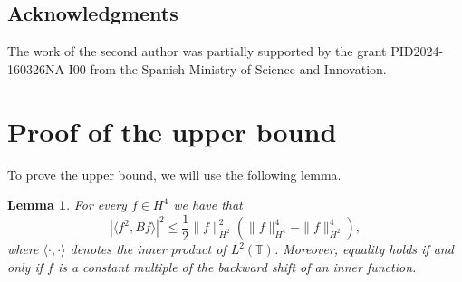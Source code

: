 \documentclass{amsart}
\theoremstyle{plain}
\newtheorem{lemma}[theo]{Lemma}
\theoremstyle{definition}
\newcommand{\T}{\mathbb{T}}
\begin{document}
    	\subsection*{Acknowledgments}
    	
    	The work of the second author was partially supported by the grant PID2024-160326NA-I00 from the Spanish Ministry of Science and Innovation.
	
	\section{Proof of the upper bound} \label{sec:UpperBound}
	
        To prove the upper bound, we will use the following lemma.
        
        \begin{lemma}\label{lemma}
            For every $f \in H^4$ we have that
            \begin{equation} \label{eqn:CubicBound}
                |\langle f^2, Bf \rangle|^2 \leq \dfrac{1}{2} \| f \|_{H^2}^2 ( \| f \|_{H^4}^4-\|f\|_{H^2}^4 ),
            \end{equation}
            where $\langle \cdot, \cdot \rangle$ denotes the inner product of $L^2 (\T)$. Moreover, equality holds if and only if $f$ is a constant multiple of the backward shift of an inner function.
        \end{lemma}
        
\end{document}
